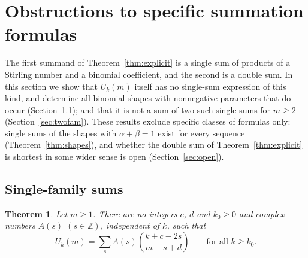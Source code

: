 \documentclass[11pt]{amsart}
\newtheorem{theorem}{Theorem}[section]
\theoremstyle{definition}
\newcommand{\Z}{\mathbb{Z}}
\begin{document}
\section{Obstructions to specific summation formulas}\label{sec:short}

The first summand of Theorem~\ref{thm:explicit} is a single sum of products of a Stirling number and a binomial coefficient, and the second is a double sum. In this section we show that $U_k(m)$ itself has no single-sum expression of this kind, and determine all binomial shapes with nonnegative parameters that do occur (Section~\ref{sec:single}); and that it is not a sum of two such single sums for $m\ge2$ (Section~\ref{sec:twofam}). These results exclude specific classes of formulas only: single sums of the shapes with $\alpha+\beta=1$ exist for every sequence (Theorem~\ref{thm:shapes}), and whether the double sum of Theorem~\ref{thm:explicit} is shortest in some wider sense is open (Section~\ref{sec:open}).

\subsection{Single-family sums}\label{sec:single}

\begin{theorem}\label{thm:S}
Let $m\ge1$. There are no integers $c$, $d$ and $k_0\ge0$ and complex numbers $A(s)$ $(s\in\Z)$, independent of $k$, such that
\[
  U_k(m)=\sum_{s}A(s)\binom{k+c-2s}{m+s+d}\qquad\text{for all }k\ge k_0 .
\]
\end{theorem}
\end{document}
